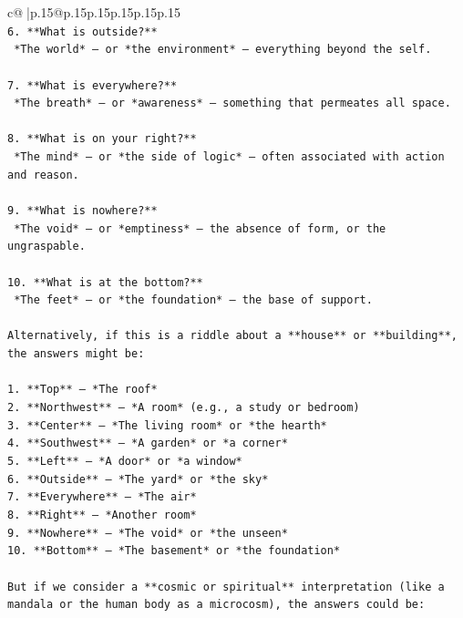 \documentclass{article}
\begin{document}
{\begin{supertabular}{c@{$\;$}|p{.15\linewidth}@{}p{.15\linewidth}p{.15\linewidth}p{.15\linewidth}p{.15\linewidth}p{.15\linewidth}}
{{{\\ 
\texttt{6. **What is outside?**  } \\
\texttt{   *The world* — or *the environment* — everything beyond the self.} \\
\\ 
\texttt{7. **What is everywhere?**  } \\
\texttt{   *The breath* — or *awareness* — something that permeates all space.} \\
\\ 
\texttt{8. **What is on your right?**  } \\
\texttt{   *The mind* — or *the side of logic* — often associated with action and reason.} \\
\\ 
\texttt{9. **What is nowhere?**  } \\
\texttt{   *The void* — or *emptiness* — the absence of form, or the ungraspable.} \\
\\ 
\texttt{10. **What is at the bottom?**  } \\
\texttt{   *The feet* — or *the foundation* — the base of support.} \\
\\ 
\texttt{Alternatively, if this is a riddle about a **house** or **building**, the answers might be:} \\
\\ 
\texttt{1. **Top** — *The roof*  } \\
\texttt{2. **Northwest** — *A room* (e.g., a study or bedroom)  } \\
\texttt{3. **Center** — *The living room* or *the hearth*  } \\
\texttt{4. **Southwest** — *A garden* or *a corner*  } \\
\texttt{5. **Left** — *A door* or *a window*  } \\
\texttt{6. **Outside** — *The yard* or *the sky*  } \\
\texttt{7. **Everywhere** — *The air*  } \\
\texttt{8. **Right** — *Another room*  } \\
\texttt{9. **Nowhere** — *The void* or *the unseen*  } \\
\texttt{10. **Bottom** — *The basement* or *the foundation*} \\
\\ 
\texttt{But if we consider a **cosmic or spiritual** interpretation (like a mandala or the human body as a microcosm), the answers could be:} \\
}}}
\end{supertabular}}
\end{document}
